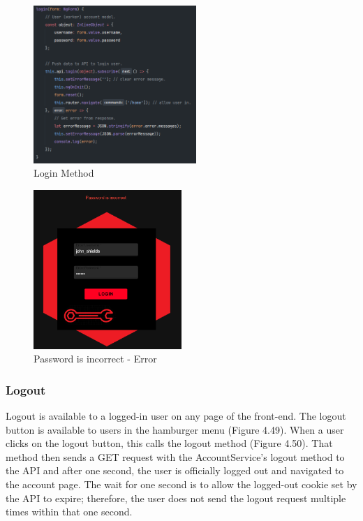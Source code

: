 \begin{figure}[H]
    \caption{Login Method}
    \label{image:loginMethod}
    \centering
    \includegraphics[width=0.55\textwidth]{images/repota/account_pages/login.png}
\end{figure}

\begin{figure}[H]
    \caption{Password is incorrect - Error}
    \label{image:failedLogin}
    \centering
    \includegraphics[width=0.5\textwidth]{images/repota/UI/failed-login.png}
\end{figure}

\subsubsection{Logout}
Logout is available to a logged-in user on any page of the front-end. The logout button is available to users in the hamburger menu (Figure 4.49). When a user clicks on the logout button, this calls the logout method (Figure 4.50). That method then sends a GET request with the AccountService's logout method to the API and after one second, the user is officially logged out and navigated to the account page. The wait for one second is to allow the logged-out cookie set by the API to expire; therefore, the user does not send the logout request multiple times within that one second.

